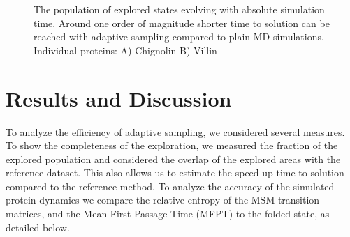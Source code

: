 \begin{figure}[H]
   \begin{subfigure}[b]{0.6\linewidth}
   {}
   \end{subfigure}%
   
   \begin{subfigure}[b]{0.6\linewidth}
   {}
   \end{subfigure}%


  \caption{The population of explored states evolving with absolute simulation time.  Around one
  order of magnitude shorter time to solution can be reached with adaptive
  sampling compared to plain MD simulations.  Individual proteins: A) Chignolin B) Villin }
\end{figure}

\begin{figure}[H]\ContinuedFloat
   \begin{subfigure}[b]{0.6\linewidth}
   {}
    \end{subfigure}%

   \begin{subfigure}[b]{0.6\linewidth}
   {}
    \end{subfigure}%
  \caption{
   }
  \label{fig:Pop_explored}
\end{figure}
\section{\label{sec:results}Results and Discussion}

To analyze the efficiency of adaptive sampling, we considered several
measures. To show the completeness of the exploration, we measured the fraction
of the explored population and considered the overlap of the explored areas with the
reference dataset. This also allows us to estimate the speed up time to solution
compared to the reference method. To analyze the accuracy of the simulated
protein dynamics we compare the relative entropy of the MSM transition
matrices, and the Mean First Passage Time (MFPT) to the folded state, as
detailed below.

